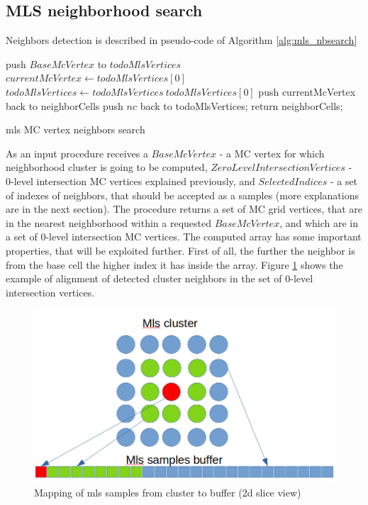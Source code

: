 \subsection{MLS neighborhood search}
Neighbors detection is described in pseudo-code of Algorithm \ref{alg:mls_nbsearch}
\begin{algorithm}[H]
	\scriptsize
	\begin{algorithmic}
		\State push $BaseMcVertex$ to $todoMlsVertices$
			\State $currentMcVertex \gets todoMlsVertices[0]$
			\State $todoMlsVertices \gets todoMlsVertices \ todoMlsVertices[0]$
				\State push currentMcVertex back to neighborCells
			\EndIf
					\State push $nc$ back to todoMlsVertices;
				\EndIf
			\EndFor
		\EndWhile
		return neighborCells;
	\end{algorithmic}
	\caption{mls MC vertex neighbors search}
	\label{alg:mls_nbsearch}
\end{algorithm}
As an input procedure receives a $BaseMcVertex$ - a MC vertex for which neighborhood cluster is going to be computed, $ZeroLevelIntersectionVertices$ - 0-level intersection MC vertices explained previously, and $SelectedIndices$ - a set of indexes of neighbors, that should be accepted as a samples (more explanations are in the next section). The procedure returns a set of MC grid vertices, that are in the nearest neighborhood within a requested $BaseMcVertex$, and which are in a set of 0-level intersection MC vertices. The computed array has some important properties, that will be exploited further. First of all, the further the neighbor is from the base cell the higher index it has inside the array. Figure \ref{fig:mls_neighbor_alignment} shows the example of alignment of detected cluster neighbors in the set of 0-level intersection vertices.\\
\begin{figure}
	\begin{center}
		\includegraphics[width=\textwidth]{figures/MlsSamplesBufferAlignment.png}
	\end{center}
	\caption{Mapping of mls samples from cluster to buffer (2d slice view)} \label{fig:mls_neighbor_alignment}
\end{figure}
